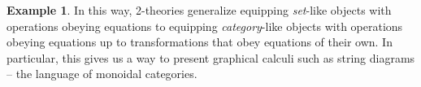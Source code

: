 \documentclass{amsart}
\theoremstyle{definition}
\newtheorem{example}[theorem]{Example}
\newcommand{\C}{\mathsf{C}}
\newcommand{\T}{\mathsf{T}}
\newcommand{\maps}{\colon}
\begin{document}
\begin{example}

In this way, 2-theories generalize equipping \textit{set}-like objects  with operations obeying equations to equipping \textit{category}-like objects with operations obeying equations up to transformations that obey equations of their own. In particular, this gives us a way to present graphical calculi such as string diagrams -- the language of monoidal categories.
\end{example}
\end{document}
